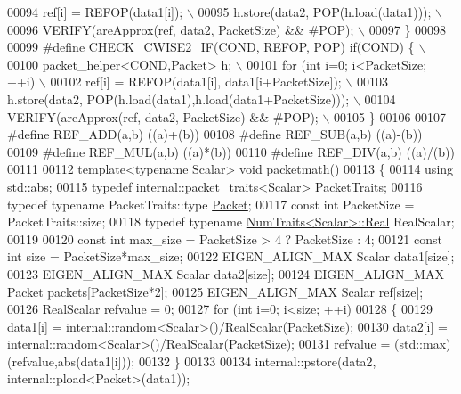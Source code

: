 \begin{DoxyCode}
00094 \textcolor{preprocessor}{    ref[i] = REFOP(data1[i]); \(\backslash\)}
00095 \textcolor{preprocessor}{  h.store(data2, POP(h.load(data1))); \(\backslash\)}
00096 \textcolor{preprocessor}{  VERIFY(areApprox(ref, data2, PacketSize) && #POP); \(\backslash\)}
00097 \textcolor{preprocessor}{\}}
00098 
00099 \textcolor{preprocessor}{#define CHECK\_CWISE2\_IF(COND, REFOP, POP) if(COND) \{ \(\backslash\)}
00100 \textcolor{preprocessor}{  packet\_helper<COND,Packet> h; \(\backslash\)}
00101 \textcolor{preprocessor}{  for (int i=0; i<PacketSize; ++i) \(\backslash\)}
00102 \textcolor{preprocessor}{    ref[i] = REFOP(data1[i], data1[i+PacketSize]); \(\backslash\)}
00103 \textcolor{preprocessor}{  h.store(data2, POP(h.load(data1),h.load(data1+PacketSize))); \(\backslash\)}
00104 \textcolor{preprocessor}{  VERIFY(areApprox(ref, data2, PacketSize) && #POP); \(\backslash\)}
00105 \textcolor{preprocessor}{\}}
00106 
00107 \textcolor{preprocessor}{#define REF\_ADD(a,b) ((a)+(b))}
00108 \textcolor{preprocessor}{#define REF\_SUB(a,b) ((a)-(b))}
00109 \textcolor{preprocessor}{#define REF\_MUL(a,b) ((a)*(b))}
00110 \textcolor{preprocessor}{#define REF\_DIV(a,b) ((a)/(b))}
00111 
00112 \textcolor{keyword}{template}<\textcolor{keyword}{typename} Scalar> \textcolor{keywordtype}{void} packetmath()
00113 \{
00114   \textcolor{keyword}{using} std::abs;
00115   \textcolor{keyword}{typedef} internal::packet\_traits<Scalar> PacketTraits;
00116   \textcolor{keyword}{typedef} \textcolor{keyword}{typename} PacketTraits::type \hyperlink{group___sparse_core___module}{Packet};
00117   \textcolor{keyword}{const} \textcolor{keywordtype}{int} PacketSize = PacketTraits::size;
00118   \textcolor{keyword}{typedef} \textcolor{keyword}{typename} \hyperlink{group___core___module_struct_eigen_1_1_num_traits}{NumTraits<Scalar>::Real} RealScalar;
00119 
00120   \textcolor{keyword}{const} \textcolor{keywordtype}{int} max\_size = PacketSize > 4 ? PacketSize : 4;
00121   \textcolor{keyword}{const} \textcolor{keywordtype}{int} size = PacketSize*max\_size;
00122   EIGEN\_ALIGN\_MAX Scalar data1[size];
00123   EIGEN\_ALIGN\_MAX Scalar data2[size];
00124   EIGEN\_ALIGN\_MAX Packet packets[PacketSize*2];
00125   EIGEN\_ALIGN\_MAX Scalar ref[size];
00126   RealScalar refvalue = 0;
00127   \textcolor{keywordflow}{for} (\textcolor{keywordtype}{int} i=0; i<size; ++i)
00128   \{
00129     data1[i] = internal::random<Scalar>()/RealScalar(PacketSize);
00130     data2[i] = internal::random<Scalar>()/RealScalar(PacketSize);
00131     refvalue = (std::max)(refvalue,abs(data1[i]));
00132   \}
00133 
00134   internal::pstore(data2, internal::pload<Packet>(data1));

\end{DoxyCode}
